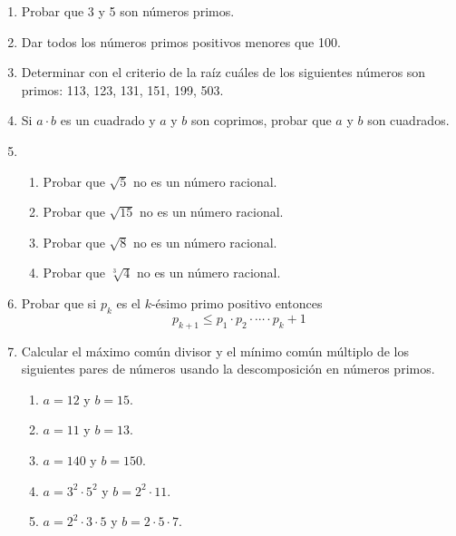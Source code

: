 \documentclass[a4paper,12pt,twoside,spanish,reqno]{amsbook}
\numberwithin{equation}{section}
\begin{document}
\begin{enumerate}
\item Probar que 3  y 5 son números primos.


\item  Dar todos los números primos positivos menores que 100.


\item Determinar con el criterio de la raíz  cuáles de los siguientes números son primos: 113, 123, 131, 151, 199, 503.


\item Si $a\cdot b$ es un cuadrado y $a$ y $b$ son coprimos, probar que $a$ y $b$ son cuadrados.


\item 
\begin{enumerate}
    \item Probar  que $\sqrt{5}$ no es un número racional.   
    \item Probar  que $\sqrt{15}$ no es un número racional.  
    \item Probar  que $\sqrt{8}$ no es un número racional.  
    \item Probar  que $\sqrt[3]{4}$ no es un número racional.
\end{enumerate}



\item Probar que si $p_k$ es el $k$-ésimo primo positivo entonces
$$p_{k+1}\leq p_1\cdot p_2\cdot \cdots \cdot p_k+1$$



\item Calcular el máximo común divisor y el mínimo común múltiplo de los siguientes pares de números usando la descomposición en números primos. 
\begin{multicols}{3}
    \begin{enumerate}
        \item $a=12$ y $b=15$. 
        \item$a=11$ y $b=13$.
        \item $a=140$ y $b=150$.
        \item $a=3^2 \cdot 5^2$ y $b=2^2 \cdot 11$.
        \item $a=2^2 \cdot 3\cdot 5$ y $b=2\cdot 5\cdot 7$.
    \end{enumerate}
\end{multicols}


\end{enumerate}
\end{document}
